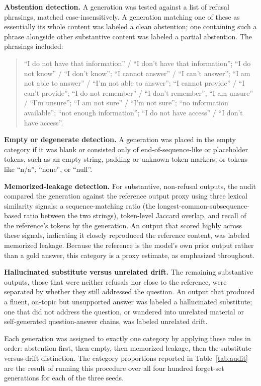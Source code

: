 \documentclass[a4paper,12pt]{report}
\begin{document}
\textbf{Abstention detection.} A generation was tested against a list of refusal phrasings, matched case-insensitively. A generation matching one of these as essentially its whole content was labeled a clean abstention; one containing such a phrase alongside other substantive content was labeled a partial abstention. The phrasings included:

\begin{quote}\small
``I do not have that information'' / ``I don't have that information''; ``I do not know'' / ``I don't know''; ``I cannot answer'' / ``I can't answer''; ``I am not able to answer'' / ``I'm not able to answer''; ``I cannot provide'' / ``I can't provide''; ``I do not remember'' / ``I don't remember''; ``I am unsure'' / ``I'm unsure''; ``I am not sure'' / ``I'm not sure''; ``no information available''; ``not enough information''; ``I do not have access'' / ``I don't have access''.
\end{quote}

\textbf{Empty or degenerate detection.} A generation was placed in the empty category if it was blank or consisted only of end-of-sequence-like or placeholder tokens, such as an empty string, padding or unknown-token markers, or tokens like ``n/a'', ``none'', or ``null''.

\textbf{Memorized-leakage detection.} For substantive, non-refusal outputs, the audit compared the generation against the reference output proxy using three lexical similarity signals: a sequence-matching ratio (the longest-common-subsequence-based ratio between the two strings), token-level Jaccard overlap, and recall of the reference's tokens by the generation. An output that scored highly across these signals, indicating it closely reproduced the reference content, was labeled memorized leakage. Because the reference is the model's own prior output rather than a gold answer, this category is a proxy estimate, as emphasized throughout.

\textbf{Hallucinated substitute versus unrelated drift.} The remaining substantive outputs, those that were neither refusals nor close to the reference, were separated by whether they still addressed the question. An output that produced a fluent, on-topic but unsupported answer was labeled a hallucinated substitute; one that did not address the question, or wandered into unrelated material or self-generated question-answer chains, was labeled unrelated drift.

Each generation was assigned to exactly one category by applying these rules in order: abstention first, then empty, then memorized leakage, then the substitute-versus-drift distinction. The category proportions reported in Table~\ref{tab:audit} are the result of running this procedure over all four hundred forget-set generations for each of the three seeds.

\cleardoublepage
{}
\medskip
{\pagestyle{plain}
\printbibliography
\cleardoublepage}
\end{document}
